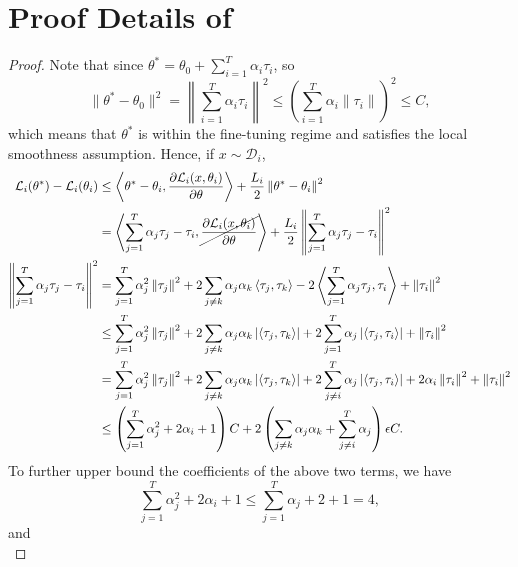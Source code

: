 \section{Proof Details of }
\label{sec:bounds-details}
\add*
\begin{proof}
Note that since $\theta^* = \theta_0 + \sum_{i=1}^T \alpha_i\tau_i$, so
\begin{equation*}
    \|\theta^* - \theta_0\|^2 = \left\|\sum_{i=1}^T\alpha_i \tau_i\right\|^2 \leq \left(\sum_{i=1}^T\alpha_i \|\tau_i\|\right)^2 \leq C,
\end{equation*}
which means that $\theta^*$ is within the fine-tuning regime and satisfies the local smoothness assumption. Hence, if $x\sim\mathcal{D}_i$,
\begin{align*}
    {\mathcal{L}}_i(\theta^*) - \mathcal{L}_i(\theta_i) &\leq \left<\theta^* - \theta_i, \frac{\partial\mathcal{L}_i(x, \theta_i)}{\partial{\theta}}\right> + \frac{L_i}{2}\left\lVert\theta^* - \theta_i\right\rVert^2\\
    &= \left<\sum\limits_{j=1}^T\alpha_j\tau_j - \tau_i, \cancel{\frac{\partial\mathcal{L}_i(x, \theta_i)}{\partial{\theta}}}\right> + \frac{L_i}{2} \left\lVert\sum\limits_{j=1}^T\alpha_j\tau_j - \tau_i\right\rVert^2\\
    \left\lVert\sum\limits_{j=1}^T\alpha_j\tau_j - \tau_i\right\rVert^2 &= \sum\limits_{j=1}^T\alpha_j^2\left\lVert\tau_j\right\rVert^2 + 2\sum_{j\neq k}\alpha_j\alpha_k\left<\tau_j, \tau_k\right> - 2\left<\sum\limits_{j=1}^T\alpha_j\tau_j,\tau_i\right> +\left\lVert\tau_i\right\rVert^2\\
    &\leq \sum\limits_{j=1}^T\alpha_j^2\left\lVert\tau_j\right\rVert^2 + 2\sum_{j\neq k}\alpha_j\alpha_k\left|\left<\tau_j, \tau_k\right>\right| + 2\sum\limits_{j=1}^T\alpha_j\left|\left<\tau_j, \tau_i\right>\right| + \left\lVert\tau_i\right\rVert^2\\
    &= \sum\limits_{j=1}^T\alpha_j^2\left\lVert\tau_j\right\rVert^2 + 2\sum_{j\neq k}\alpha_j\alpha_k\left|\left<\tau_j, \tau_k\right>\right| + 2\sum\limits_{j\neq i}^T\alpha_j\left|\left<\tau_j, \tau_i\right>\right| + 2\alpha_i\left\lVert\tau_i\right\rVert^2 + \left\lVert\tau_i\right\rVert^2\\
    &\leq \left(\sum\limits_{j=1}^T\alpha_j^2+2\alpha_i+1\right)C + 2\left(\sum_{j\neq k}\alpha_j\alpha_k+\sum\limits_{j\neq i}^T\alpha_j\right)\epsilon C.
\end{align*}
To further upper bound the coefficients of the above two terms, we have
\begin{equation*}
    \sum\limits_{j=1}^T\alpha_j^2+2\alpha_i+1 \leq \sum_{j=1}^T \alpha_j + 2 + 1 = 4,
\end{equation*}
and
\begin{equation*}

\end{equation*}
\end{proof}
